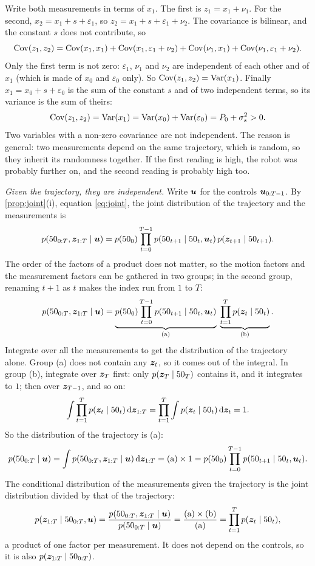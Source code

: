 Write both measurements in terms of $x_1$. The first is
$z_1=x_1+\nu_1$. For the second, $x_2=x_1+s+\varepsilon_1$, so
$z_2=x_1+s+\varepsilon_1+\nu_2$. The covariance is bilinear, and the
constant $s$ does not contribute, so
\[
  \operatorname{Cov}(z_1,z_2)=\operatorname{Cov}(x_1,x_1)+\operatorname{Cov}(x_1,\varepsilon_1+\nu_2)
  +\operatorname{Cov}(\nu_1,x_1)+\operatorname{Cov}(\nu_1,\varepsilon_1+\nu_2).
\]
Only the first term is not zero: $\varepsilon_1$, $\nu_1$ and $\nu_2$ are
independent of each other and of $x_1$ (which is made of $x_0$ and
$\varepsilon_0$ only). So $\operatorname{Cov}(z_1,z_2)=\operatorname{Var}(x_1)$. Finally
$x_1=x_0+s+\varepsilon_0$ is the sum of the constant $s$ and of two
independent terms, so its variance is the sum of theirs:
\[
  \operatorname{Cov}(z_1,z_2)=\operatorname{Var}(x_1)=\operatorname{Var}(x_0)+\operatorname{Var}(\varepsilon_0)=P_0+\sigma_s^2>0 .
\]
Two variables with a non-zero covariance are not independent. The reason
is general: two measurements depend on the same trajectory, which is
random, so they inherit its randomness together. If the first reading is
high, the robot was probably further on, and the second reading is
probably high too.

\emph{Given the trajectory, they are independent.} Write $\bm{u}$ for the
controls $\bm{u}_{0:T-1}$. By \cref{prop:joint}(i), equation
\eqref{eq:joint}, the joint distribution of the trajectory and the
measurements is
\[
  p(50_{0:T},\bm{z}_{1:T}\mid\bm{u})
  =p(50_0)\prod_{t=0}^{T-1}p(50_{t+1}\mid50_t,\bm{u}_t)\,p(\bm{z}_{t+1}\mid50_{t+1}).
\]
The order of the factors of a product does not matter, so the motion
factors and the measurement factors can be gathered in two groups; in the
second group, renaming $t+1$ as $t$ makes the index run from $1$ to $T$:
\[
  p(50_{0:T},\bm{z}_{1:T}\mid\bm{u})
  =\underbrace{p(50_0)\prod_{t=0}^{T-1}p(50_{t+1}\mid50_t,\bm{u}_t)}_{\text{(a)}}\;
  \underbrace{\prod_{t=1}^{T}p(\bm{z}_t\mid50_t)}_{\text{(b)}} .
\]
Integrate over all the measurements to get the distribution of the
trajectory alone. Group (a) does not contain any $\bm{z}_t$, so it comes out
of the integral. In group (b), integrate over $\bm{z}_T$ first: only
$p(\bm{z}_T\mid50_T)$ contains it, and it integrates to $1$; then over
$\bm{z}_{T-1}$, and so on:
\[
  \int\prod_{t=1}^Tp(\bm{z}_t\mid50_t)\,\mathrm d\bm{z}_{1:T}
  =\prod_{t=1}^T\int p(\bm{z}_t\mid50_t)\,\mathrm d\bm{z}_t=1 .
\]
So the distribution of the trajectory is (a):
\[
  p(50_{0:T}\mid\bm{u})=\int p(50_{0:T},\bm{z}_{1:T}\mid\bm{u})\,\mathrm d\bm{z}_{1:T}
  =\text{(a)}\times1
  =p(50_0)\prod_{t=0}^{T-1}p(50_{t+1}\mid50_t,\bm{u}_t).
\]
The conditional distribution of the measurements given the trajectory is
the joint distribution divided by that of the trajectory:
\[
  p(\bm{z}_{1:T}\mid50_{0:T},\bm{u})
  =\frac{p(50_{0:T},\bm{z}_{1:T}\mid\bm{u})}{p(50_{0:T}\mid\bm{u})}
  =\frac{\text{(a)}\times\text{(b)}}{\text{(a)}}
  =\prod_{t=1}^Tp(\bm{z}_t\mid50_t),
\]
a product of one factor per measurement. It does not depend on the
controls, so it is also $p(\bm{z}_{1:T}\mid50_{0:T})$.

